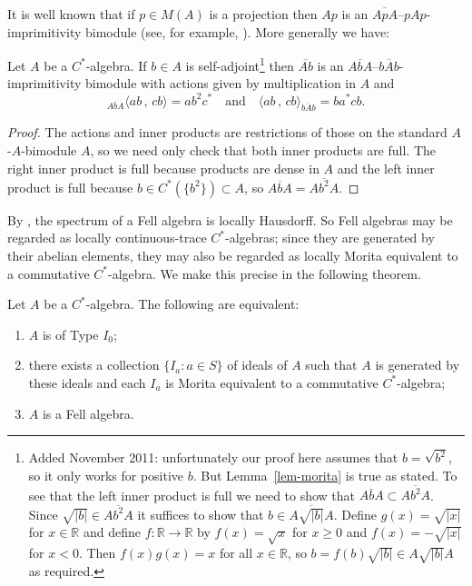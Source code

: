 \documentclass[12pt,a4paper]{amsart}
\newcommand{\field}[1]{\mathbb{#1}}
\newcommand{\RR}{\field{R}}
\begin{document}
It is well known that if $p\in M(A)$ is a projection then $Ap$
is an $\overline{ApA}$--$pAp$-imprimitivity bimodule (see, for
example, \cite[Example~3.6]{tfb}).  More generally we have:


\begin{lemma}\label{lem-morita}
Let $A$ be a $C^*$-algebra. If $b\in A$ is self-adjoint\footnote{Added November 2011: unfortunately
our proof here assumes that $b=\sqrt{b^2}$, so it only works for positive $b$. But
Lemma~\ref{lem-morita} is true as stated.  To see that the left inner product is full we need to
show that $\overline{AbA}\subset \overline{Ab^2A}$. Since $\sqrt{|b|} \in \overline{Ab^2A}$ it
suffices to show that $b \in \overline{A\sqrt{|b|}A}$. Define $g(x)=\sqrt{|x|}$ for $x \in \RR$ and
define $f : \RR \to \RR$ by $f(x) = \sqrt{x}$ for $x \ge 0$ and $f(x) = -\sqrt{|x|}$ for $x < 0$.
Then $f(x)g(x) = x$ for all $x \in \RR$, so $b = f(b)\sqrt{|b|} \in A \sqrt{|b|} A$ as required.}
then $\overline{Ab}$ is an $\overline{AbA}$--$\overline{bAb}$-imprimitivity bimodule with actions
given by multiplication in $A$ and
\[
{}_{\overline{AbA}}\langle ab\,,\, cb\rangle=ab^2c^*\quad\text{and}\quad\langle ab\,,\, cb\rangle_{\overline{bAb}}=ba^*cb.
\]
\end{lemma}

\begin{proof}
The actions and inner products are restrictions of those on the
standard $A$-$A$-bimodule $A$, so we need only check that both
inner products are full.  The right inner product is full
because products are dense in $A$ and the left inner product is
full because $b \in C^*(\{b^2\}) \subset A$, so
${\overline{AbA}}={\overline{Ab^2A}}$.
\end{proof}

By \cite[Corollary~3.4]{AS}, the spectrum of a Fell algebra is
locally Hausdorff. So Fell algebras may be regarded as locally
continuous-trace $C^*$-algebras; since they are generated by
their abelian elements, they may also be regarded as locally
Morita equivalent to a commutative $C^*$-algebra. We make this
precise in the following theorem.


\begin{thm}\label{thm-fell}
Let $A$ be a $C^*$-algebra. The following are equivalent:
\begin{enumerate}
\item $A$ is of Type $I_0$;
\item there exists a collection $\{I_a : a \in S\}$ of
    ideals of $A$ such that $A$ is generated by these ideals
    and each $I_a$ is Morita equivalent to a commutative
    $C^*$-algebra;
\item $A$ is a Fell algebra.
\end{enumerate}
\end{thm}
\end{document}

